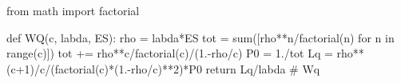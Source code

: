 
from math import factorial

def WQ(c, labda, ES):
    rho = labda*ES
    tot = sum([rho**n/factorial(n) for n in range(c)])
    tot += rho**c/factorial(c)/(1.-rho/c)
    P0 = 1./tot
    Lq = rho**(c+1)/c/(factorial(c)*(1.-rho/c)**2)*P0
    return Lq/labda # Wq


